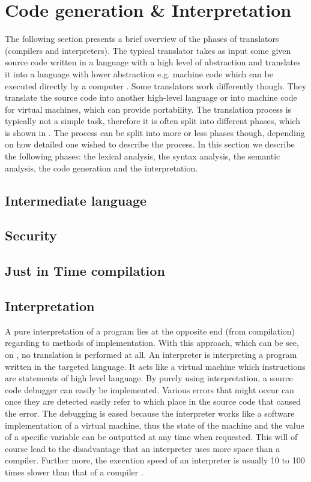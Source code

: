 \section{Code generation \& Interpretation}
The following section presents a brief overview of the phases of translators (compilers and interpreters). The typical translator takes as input some given source code written in a language with a high level of abstraction and translates it into a language with lower abstraction e.g. machine code which can be executed directly by a computer \cite[p. 44]{sebesta2013}. Some translators work differently though. They translate the source code into another high-level language or into machine code for virtual machines, which can provide portability. The translation process is typically not a simple task, therefore it is often split into different phases, which is shown in . The process can be split into more or less phases though, depending on how detailed one wished to describe the process. In this section we describe the following phases: the lexical analysis, the syntax analysis, the semantic analysis, the code generation and the interpretation.



\subsection{Intermediate language}

\subsection{Security}

\subsection{Just in Time compilation}

\subsection{Interpretation}
A pure interpretation of a program lies at the opposite end (from compilation) regarding to methods of implementation. With this approach, which can be see, on , no translation is performed at all. An interpreter is interpreting a program written in the targeted language. It acts like a virtual machine which instructions are statements of high level language. By purely using interpretation, a source code debugger can easily be implemented. Various errors that might occur can once they are detected easily refer to which place in the source code that caused the error. The debugging is eased because the interpreter works like a software implementation of a virtual machine, thus the state of the machine and the value of a specific variable can be outputted at any time when requested. This will of course lead to the disadvantage that an interpreter uses more space than a compiler. Further more, the execution speed of an interpreter is usually 10 to 100 times slower than that of a compiler \cite[p. 48]{sebesta2013}.

